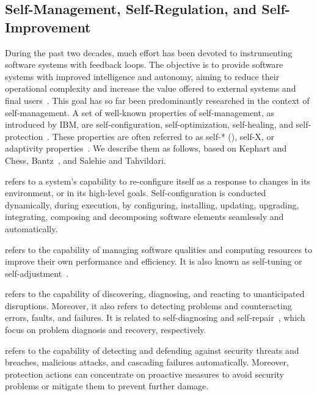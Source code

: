 \subsection{Self-Management, Self-Regulation, and Self-Improvement}
\label{subsect:background--self-management-regulation-improvement}

During the past two decades, much effort has been devoted to instrumenting software systems with feedback loops. The objective is to provide software systems with improved intelligence and autonomy, aiming to reduce their operational complexity and increase the value offered to external systems and final users~\cite{brun-2009-engineering}. This goal has so far been predominantly researched in the context of self-management. A set of well-known properties of self-management, as introduced by IBM, are self-configuration, self-optimization, self-healing, and self-protection~\cite{bantz-2003-autonomic,kephart-2003-vision}. These properties are often referred to as self-* (), self-X, or adaptivity properties~\cite{salehie-2009-self-adaptive,huebscher-2008-survey}. We describe them as follows, based on Kephart and Chess, Bantz~\etal{}, and Salehie and Tahvildari.

\begin{description}[style=unboxed,leftmargin=0pt,font=\normalsize\bfseries]
	\item[Self-configuration] refers to a system's capability to re-configure itself as a response to changes in its environment, or in its high-level goals. Self-configuration is conducted dynamically, during execution, by configuring, installing, updating, upgrading, integrating, composing and decomposing software elements seamlessly and automatically.

	\item[Self-optimization] refers to the capability of managing software qualities and computing resources to improve their own performance and efficiency. It is also known as self-tuning or self-adjustment~\cite{sterritt-2005-concise}.

	\item[Self-healing] refers to the capability of discovering, diagnosing, and reacting to unanticipated disruptions. Moreover, it also refers to detecting problems and counteracting errors, faults, and failures. It is related to self-diagnosing and self-repair~\cite{de-lemos-2002-architectural}, which focus on problem diagnosis and recovery, respectively.

	\item[Self-protection] refers to the capability of detecting and defending against security threats and breaches, malicious attacks, and cascading failures automatically. Moreover, protection actions can concentrate on proactive measures to avoid security problems or mitigate them to prevent further damage.
\end{description}

